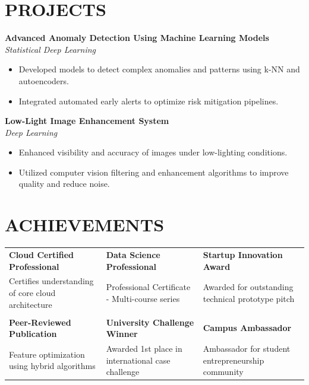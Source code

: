\documentclass[a4paper,11pt]{article}
\newcommand{\safehref}[2]{#2}
\let\href\safehref
\newcommand{\extlink}{\raisebox{0.2ex}{\scriptsize\faExternalLink*}}
\begin{document}
\section*{PROJECTS}
\sloppy
\noindent\textbf{\href{https://example.com}{Advanced Anomaly Detection Using Machine Learning Models\ \extlink}}\\
\textit{Statistical Deep Learning}
\begin{itemize}
  \item Developed models to detect complex anomalies and patterns using k-NN and autoencoders.
  \item Integrated automated early alerts to optimize risk mitigation pipelines.
\end{itemize}

\vspace{0.15cm}
\noindent\textbf{\href{https://example.com}{Low-Light Image Enhancement System\ \extlink}}\\
\textit{Deep Learning}
\begin{itemize}
  \item Enhanced visibility and accuracy of images under low-lighting conditions.
  \item Utilized computer vision filtering and enhancement algorithms to improve quality and reduce noise.
\end{itemize}
\fussy

\section*{ACHIEVEMENTS}
{\small
\setlength{\tabcolsep}{8pt}
\renewcommand{\arraystretch}{1.15}
\begin{tabularx}{\textwidth}{@{}>{\RaggedRight\arraybackslash}X >{\RaggedRight\arraybackslash}X >{\RaggedRight\arraybackslash}X@{}}
  \textbf{\href{https://example.com}{Cloud Certified Professional\ \extlink}} &
  \textbf{\href{https://example.com}{Data Science Professional\ \extlink}} &
  \textbf{\href{https://example.com}{Startup Innovation Award\ \extlink}} \\
  Certifies understanding of core cloud architecture &
  Professional Certificate - Multi-course series &
  Awarded for outstanding technical prototype pitch \\
  \\[-2pt]
  \textbf{\href{https://example.com}{Peer-Reviewed Publication\ \extlink}} &
  \textbf{\href{https://example.com}{University Challenge Winner\ \extlink}} &
  \textbf{\href{https://example.com}{Campus Ambassador\ \extlink}} \\
  Feature optimization using hybrid algorithms &
  Awarded 1st place in international case challenge &
  Ambassador for student entrepreneurship community \\
\end{tabularx}
}
\end{document}
